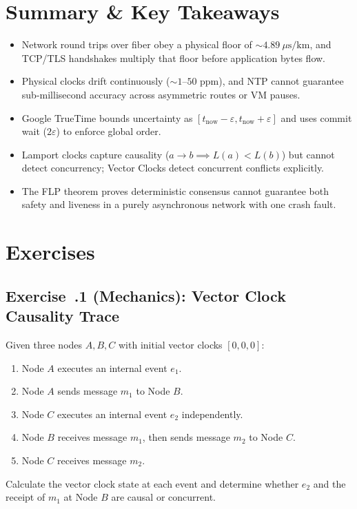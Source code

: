 \section{Summary \protect\& Key Takeaways}
\begin{itemize}[leftmargin=18pt]
  \item Network round trips over fiber obey a physical floor of $\sim 4.89\ \mu\text{s/km}$, and TCP/TLS handshakes multiply that floor before application bytes flow.
  \item Physical clocks drift continuously ($\sim 1\text{--}50\text{ ppm}$), and NTP cannot guarantee sub-millisecond accuracy across asymmetric routes or VM pauses.
  \item Google TrueTime bounds uncertainty as $[t_{\text{now}}-\varepsilon, t_{\text{now}}+\varepsilon]$ and uses commit wait ($2\varepsilon$) to enforce global order.
  \item Lamport clocks capture causality ($a \to b \implies L(a) < L(b)$) but cannot detect concurrency; Vector Clocks detect concurrent conflicts explicitly.
  \item The FLP theorem proves deterministic consensus cannot guarantee both safety and liveness in a purely asynchronous network with one crash fault.
\end{itemize}

\section{Exercises}

\subsection*{Exercise~\thechapter.1 (Mechanics): Vector Clock Causality Trace}
Given three nodes $A, B, C$ with initial vector clocks $[0, 0, 0]$:
\begin{enumerate}[leftmargin=18pt]
  \item Node $A$ executes an internal event $e_1$.
  \item Node $A$ sends message $m_1$ to Node $B$.
  \item Node $C$ executes an internal event $e_2$ independently.
  \item Node $B$ receives message $m_1$, then sends message $m_2$ to Node $C$.
  \item Node $C$ receives message $m_2$.
\end{enumerate}
Calculate the vector clock state at each event and determine whether $e_2$ and the receipt of $m_1$ at Node $B$ are causal or concurrent.

